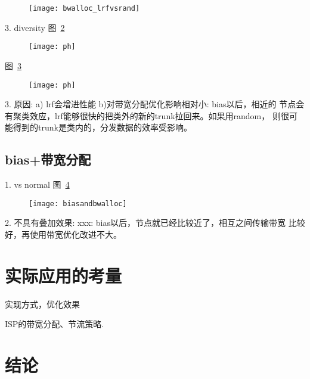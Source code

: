 \begin{figure}
  \centering
  \begin{minipage}{0.8\linewidth}
    \centering
    \texttt{[image: bwalloc\_lrfvsrand]}
    \caption{}
    \label{fig:bwalloc_lrfvsrand}
  \end{minipage}
\end{figure}

3. diversity
图~\ref{fig:diversity_bias}

\begin{figure}
  \centering
  \begin{minipage}{0.8\linewidth}
    \centering
    \texttt{[image: ph]}
    \caption{}
    \label{fig:diversity_bias}
  \end{minipage}
\end{figure}

图~\ref{fig:diversity_bwalloc}
\begin{figure}
  \centering
  \begin{minipage}{0.8\linewidth}
    \centering
    \texttt{[image: ph]}
    \caption{}
    \label{fig:diversity_bwalloc}
  \end{minipage}
\end{figure}

3. 原因: a) lrf会增进性能 b)对带宽分配优化影响相对小: bias以后，相近的
节点会有聚类效应，lrf能够很快的把类外的新的trunk拉回来。如果用random，
则很可能得到的trunk是类内的，分发数据的效率受影响。


\subsection{bias+带宽分配}
1. vs normal
图~\ref{fig:biasandbwalloc}

\begin{figure}
  \centering
  \begin{minipage}{0.8\linewidth}
    \centering
    \texttt{[image: biasandbwalloc]}
    \caption{}
    \label{fig:biasandbwalloc}
  \end{minipage}
\end{figure}

2. 不具有叠加效果: xxx: bias以后，节点就已经比较近了，相互之间传输带宽
比较好，再使用带宽优化改进不大。

\section{实际应用的考量}

实现方式，优化效果

ISP的带宽分配、节流策略.

\section{结论}

